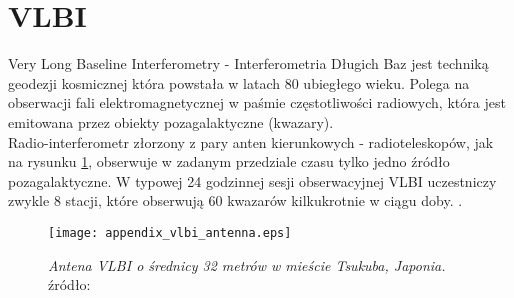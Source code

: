 \section{VLBI}
Very Long Baseline Interferometry - Interferometria Długich Baz jest techniką geodezji kosmicznej która powstała w latach 80 ubiegłego wieku.
Polega na obserwacji fali elektromagnetycznej w paśmie częstotliwości radiowych, która jest emitowana przez obiekty pozagalaktyczne (kwazary).\\
\indent Radio-interferometr złorzony z pary anten kierunkowych - radioteleskopów, jak na rysunku \ref{fig:vlbi_antenna}, obserwuje w zadanym przedziale czasu
tylko jedno źródło pozagalaktyczne. W typowej 24 godzinnej sesji obserwacyjnej VLBI uczestniczy zwykle 8 stacji, które obserwują 60 kwazarów kilkukrotnie w ciągu doby.
\cite[][strona 27]{ggos}.
\begin{figure}[H]
\centering
\texttt{[image: appendix\_vlbi\_antenna.eps]}
\caption{\textit{Antena VLBI o średnicy 32 metrów w mieście Tsukuba, Japonia.} źródło: \cite[][strona 28]{ggos}}
\label{fig:vlbi_antenna}
\end{figure}

